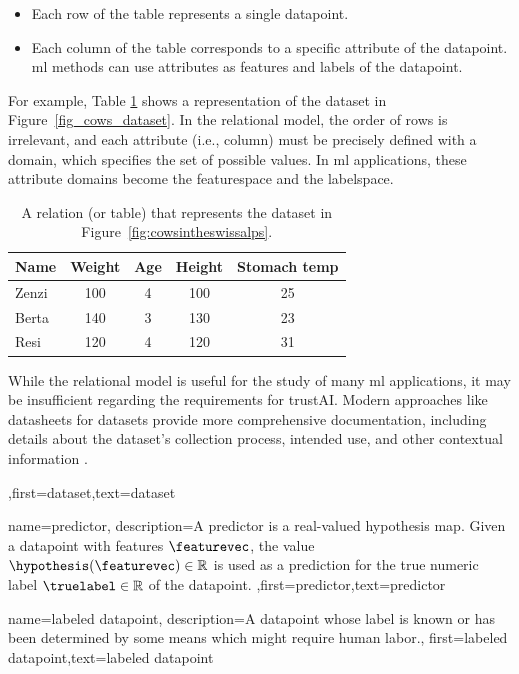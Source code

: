 {{{{\begin{itemize}
		\item Each row of the table represents a single \gls{datapoint}.
		\item Each column of the table corresponds to a specific attribute of the \gls{datapoint}. 
		\gls{ml} methods can use attributes as \gls{feature}s and \gls{label}s of the \gls{datapoint}.
		\end{itemize}
		For example, Table \ref{tab:cowdata} shows a representation of the dataset in Figure\ \ref{fig_cows_dataset}. 
		In the relational \gls{model}, the order of rows is irrelevant, and each attribute (i.e., column) must be 
		precisely defined with a domain, which specifies the set of possible values. In \gls{ml} applications, 
		these attribute domains become the \gls{featurespace} and the \gls{labelspace}.
		\begin{table}[H]
			\centering
			\begin{tabular}{lcccc}
				\hline
				\textbf{Name} & \textbf{Weight} & \textbf{Age} & \textbf{Height} & \textbf{Stomach temp} \\
				\hline
				Zenzi & 100 & 4 & 100 & 25 \\
				Berta & 140 & 3 & 130 & 23 \\
				Resi  & 120 & 4 & 120 & 31 \\
				\hline
			\end{tabular}
			\caption{A relation (or table) that represents the dataset in Figure\ \ref{fig:cowsintheswissalps}.}
			\label{tab:cowdata}
		\end{table}
 While the relational model is useful for the study of many \gls{ml} applications, it may be 
 insufficient regarding the requirements for \gls{trustAI}. Modern 
 approaches like datasheets for datasets provide more comprehensive 
 documentation, including details about the dataset’s collection process, intended 
 use, and other contextual information \cite{DatasheetData2021}.},first={dataset},text={dataset}  
}

{name={predictor},
	description={A predictor is a real-valued \gls{hypothesis} map. 
		Given a \gls{datapoint} with \gls{feature}s $\featurevec$, the value 
		$\hypothesis(\featurevec) \in \mathbb{R}$ is used as a \gls{prediction} for the true 
		numeric \gls{label} $\truelabel \in \mathbb{R}$ of the \gls{datapoint}. },first={predictor},text={predictor}  
}

{name={labeled datapoint},
 description={A \gls{datapoint} whose \gls{label} is known or has been determined 
 	by some means which might require human labor.},
 first={labeled datapoint},text={labeled datapoint}  
}

}}
